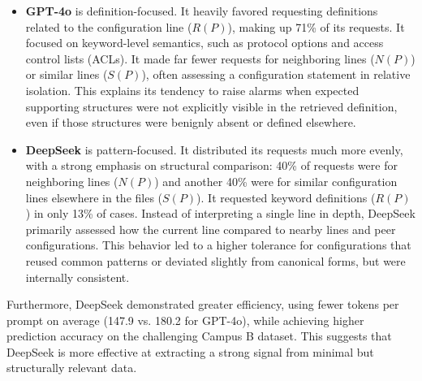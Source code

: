 \begin{itemize}
    \item \textbf{GPT-4o} is definition-focused. It heavily favored requesting definitions related to the configuration line ($R(P)$), making up 71\% of its requests. It focused on keyword-level semantics, such as protocol options and access control lists (ACLs). It made far fewer requests for neighboring lines ($N(P)$) or similar lines ($S(P)$), often assessing a configuration statement in relative isolation. This explains its tendency to raise alarms when expected supporting structures were not explicitly visible in the retrieved definition, even if those structures were benignly absent or defined elsewhere.

    \item \textbf{DeepSeek} is pattern-focused. It distributed its requests much more evenly, with a strong emphasis on structural comparison: 40\% of requests were for neighboring lines ($N(P)$) and another 40\% were for similar configuration lines elsewhere in the files ($S(P)$). It requested keyword definitions ($R(P)$) in only 13\% of cases. Instead of interpreting a single line in depth, DeepSeek primarily assessed how the current line compared to nearby lines and peer configurations. This behavior led to a higher tolerance for configurations that reused common patterns or deviated slightly from canonical forms, but were internally consistent.
\end{itemize}

Furthermore, DeepSeek demonstrated greater efficiency, using fewer tokens per prompt on average (147.9 vs. 180.2 for GPT-4o), while achieving higher prediction accuracy on the challenging Campus B dataset. This suggests that DeepSeek is more effective at extracting a strong signal from minimal but structurally relevant data.


\begin{table}[t]
    \centering
    \caption{Comparison of average token count per context type in \texttt{additional\_info} blocks between GPT-4o and DeepSeek backends.}
    \label{tab:\sysname{}_token_dist_comparison}
\end{table}


